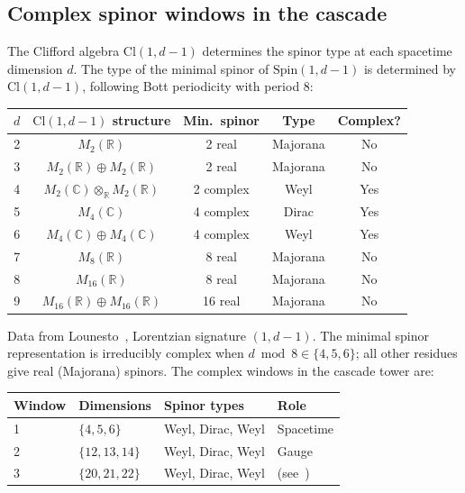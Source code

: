 \documentclass[12pt,a4paper]{article}
\begin{document}
\subsection{Complex spinor windows in the cascade}

The Clifford algebra $\mathrm{Cl}(1,d-1)$ determines the spinor type at each spacetime
dimension $d$. The type of the minimal spinor of $\mathrm{Spin}(1,d-1)$ is determined by
$\mathrm{Cl}(1,d-1)$, following Bott periodicity with period 8:

\begin{center}
\begin{tabular}{ccccc}
\toprule
$d$ & $\mathrm{Cl}(1,d-1)$ structure & Min.\ spinor & Type & Complex? \\
\midrule
2 & $M_2(\mathbb{R})$ & 2 real & Majorana & No \\
3 & $M_2(\mathbb{R})\oplus M_2(\mathbb{R})$ & 2 real & Majorana & No \\
4 & $M_2(\mathbb{C})\otimes_{\mathbb{R}}M_2(\mathbb{R})$ & 2 complex & Weyl & Yes \\
5 & $M_4(\mathbb{C})$ & 4 complex & Dirac & Yes \\
6 & $M_4(\mathbb{C})\oplus M_4(\mathbb{C})$ & 4 complex & Weyl & Yes \\
7 & $M_8(\mathbb{R})$ & 8 real & Majorana & No \\
8 & $M_{16}(\mathbb{R})$ & 8 real & Majorana & No \\
9 & $M_{16}(\mathbb{R})\oplus M_{16}(\mathbb{R})$ & 16 real & Majorana & No \\
\bottomrule
\end{tabular}
\end{center}

Data from Lounesto~\cite{lounesto}, Lorentzian signature $(1,d-1)$. The minimal spinor
representation is irreducibly complex when $d\bmod 8\in\{4,5,6\}$; all other residues give
real (Majorana) spinors. The complex windows in the cascade tower are:

\begin{center}
\begin{tabular}{llll}
\toprule
Window & Dimensions & Spinor types & Role \\
\midrule
1 & $\{4,5,6\}$   & Weyl, Dirac, Weyl & Spacetime \\
2 & $\{12,13,14\}$ & Weyl, Dirac, Weyl & Gauge \\
3 & $\{20,21,22\}$ & Weyl, Dirac, Weyl & (see~\cite{paperIVb}) \\
\bottomrule
\end{tabular}
\end{center}
\end{document}
